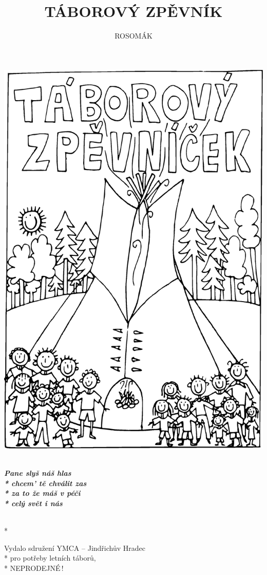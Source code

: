 \documentclass[11pt,a4paper,twoside]{article}
\title{TÁBOROVÝ ZPĚVNÍK}
\author{ROSOMÁK}
\begin{document}
\sffamily
\huge



\vspace*{2mm}
\hspace*{-0.15\textwidth}\includegraphics[width=1.15\textwidth]{titulni.eps}
\vfil\ 


\vspace*{3cm}
\parbox{14cm}{\centering \huge \itshape \bfseries Pane slyš náš hlas \\*
chcem' tě chválit zas \\*
za to že máš v péči\\*
celý svět i nás}
\vspace*{15cm}
\\*
\parbox{14cm}{\centering Vydalo sdružení YMCA -- Jindřichův Hradec \\*
pro potřeby letních táborů, \the\year \\*
NEPRODEJNÉ\,!}
\end{document}
